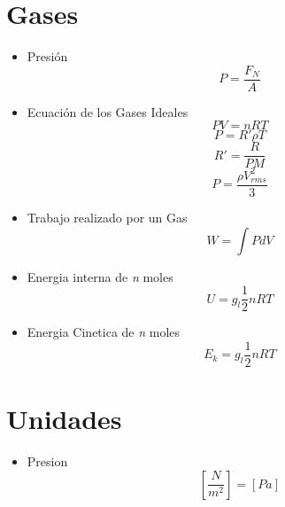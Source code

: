 \documentclass[10pt,twocolumn]{article}
\begin{document}
\section{Gases}
\begin{itemize}
\item Presión
\[ P = \frac{F_N}{A} \]
\item Ecuación de los Gases Ideales
\[ PV = nRT \]
\[ P = R'\rho T \]
\[ R' = \frac{R}{PM} \]
\[ P = \frac{\rho V_{rms}^2}{3} \]
\item Trabajo realizado por un Gas
\[ W = \int P dV \]
\item Energia interna de \textit{n} moles
\[ U = g_l \frac{1}{2} nRT\]
\item Energia Cinetica de \textit{n} moles
\[ E_k = g_l \frac{1}{2} nRT \]
\end{itemize}


\section{Unidades}
\begin{itemize}
\item Presion
\[\left[\frac{N}{m^2}\right] =  \left[Pa\right] \]
\end{itemize}
\end{document}
